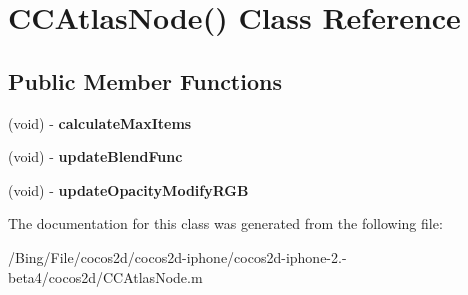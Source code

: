 \hypertarget{interface_c_c_atlas_node_07_08}{\section{C\-C\-Atlas\-Node() Class Reference}
\label{interface_c_c_atlas_node_07_08}
}
\subsection*{Public Member Functions}
\begin{DoxyCompactItemize}
\item 
\hypertarget{interface_c_c_atlas_node_07_08_abc09549aba2ce9ea00907b67c7bee41e}{(void) -\/ {\bfseries calculate\-Max\-Items}}\label{interface_c_c_atlas_node_07_08_abc09549aba2ce9ea00907b67c7bee41e}

\item 
\hypertarget{interface_c_c_atlas_node_07_08_a4345619bc271d4610a5be6f94048e835}{(void) -\/ {\bfseries update\-Blend\-Func}}\label{interface_c_c_atlas_node_07_08_a4345619bc271d4610a5be6f94048e835}

\item 
\hypertarget{interface_c_c_atlas_node_07_08_a737cf1f0f6c4a3440b954eedfa683e5e}{(void) -\/ {\bfseries update\-Opacity\-Modify\-R\-G\-B}}\label{interface_c_c_atlas_node_07_08_a737cf1f0f6c4a3440b954eedfa683e5e}

\end{DoxyCompactItemize}


The documentation for this class was generated from the following file\-:\begin{DoxyCompactItemize}
\item 
/\-Bing/\-File/cocos2d/cocos2d-\/iphone/cocos2d-\/iphone-\/2.-\/beta4/cocos2d/C\-C\-Atlas\-Node.\-m\end{DoxyCompactItemize}
